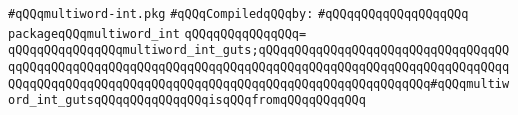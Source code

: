 \label{src/lib/std/multiword-int.pkg}
\verb|#qQQqmultiword-int.pkg|\newline
\newline
\verb|#qQQqCompiledqQQqby:|\newline
\verb|#qQQqqQQqqQQqqQQqqQQq|\newline
\newline
\verb|packageqQQqmultiword_int|\newline
\verb|qQQqqQQqqQQqqQQq=|\newline
\verb|qQQqqQQqqQQqqQQqmultiword_int_guts;qQQqqQQqqQQqqQQqqQQqqQQqqQQqqQQqqQQqqQQqqQQqqQQqqQQqqQQqqQQqqQQqqQQqqQQqqQQqqQQqqQQqqQQqqQQqqQQqqQQqqQQqqQQqqQQqqQQqqQQqqQQqqQQqqQQqqQQqqQQqqQQqqQQqqQQqqQQqqQQqqQQq#qQQqmultiword_int_gutsqQQqqQQqqQQqqQQqisqQQqfromqQQqqQQqqQQq|\newline
\newline
\newline

